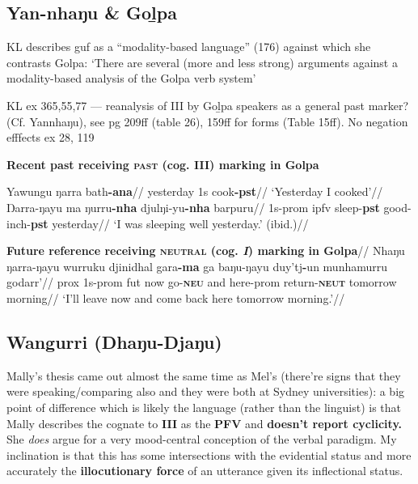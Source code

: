 
\subsection{Yan-nhaŋu \& Goḻpa}

KL describes \gls{guf} as a ``modality-based language'' (176) against which she contrasts Golpa: `There are several (more and less strong) arguments against a modality-based analysis of the Golpa verb system' \citep[179ff]{Kabisch-Lindenlaub2017}

KL ex 365,55,77 --- reanalysis of III by Goḻpa speakers as a general past marker? (Cf. Yannhaŋu), see pg 209ff (table 26), 159ff for forms (Table 15ff).
No negation efffects ex 28, 119


\pex\textbf{Recent past receiving \textsc{past} (cog. \textbf{III}) marking in Golpa}

\a\begingl\gla Yawungu ŋarra bath\textbf{-ana}//
\glb yesterday 1s cook\textbf{-\gls{pst}}//
\glft `Yesterday I cooked'//\endgl
\a\begingl\gla Ŋarra-ŋayu ma ŋurru\textbf{-nha} djulŋi-yu\textbf{-nha} barpuru//
\glb 1s-\gls{prom} \gls{ipfv} sleep-\textbf{\gls{pst}} good-\gls{inch}-\textbf{\gls{pst}} yesterday//
\glft`I was sleeping well yesterday.' \trailingcitation(ibid.)//\endgl\xe

\pex \begingl\glpreamble \textbf{Future reference receiving \textsc{neutral} (cog. \textit{I}) marking in Golpa}//
\gla Nhaŋu ŋarra-ŋayu wurruku djinidhal gara\textbf{-ma} ga baŋu-ŋayu duy’tj\textbf-{un} munhamurru godarr’//
\glb \gls{prox} 1s-\gls{prom} \gls{fut} now go-\textbf{\textsc{neu}} and here-\gls{prom} return-\textbf{\textsc{neut}} tomorrow morning//
\glft `I'll leave now and come back here tomorrow morning.'//
\endgl\xe



\subsection{Wangurri (Dhaŋu-Djaŋu)}

Mally's thesis came out almost the same time as Mel's (there're signs that they were speaking/comparing also and they were both at Sydney universities): a big point of difference which is likely the language (rather than the linguist) is that Mally describes the cognate to \textbf{III} as the \textbf{PFV} and \textbf{doesn't report cyclicity.} She \textit{does} argue for a very mood-central conception of the verbal paradigm. My inclination is that this has some intersections with the evidential status and more accurately the \textbf{illocutionary force} of an utterance given its inflectional status.

